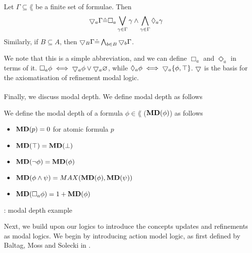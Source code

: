 \begin{defn} \label{coverDef}
Let $\Gamma \subseteq \lang$ be a finite set of formulae.
Then
\[
  \bigtriangledown_a \Gamma \hat{=} \Box_a \bigvee_{\gamma \in \Gamma} \gamma \land
  \bigwedge_{\gamma \in \Gamma} \Diamond_a \gamma
\]
Similarly, if $B \subseteq A$, then $\bigtriangledown_B \Gamma \hat{=} \bigwedge_{b \in B}
\bigtriangledown_b \Gamma$.
\end{defn}
We note that this is a simple abbreviation, and we can define $\Box_a$ and
$\Diamond_a$ in terms of it.
$\Box_a \phi \iff \bigtriangledown_a \phi \lor \bigtriangledown_a \varnothing$, while $\Diamond_a
\phi \iff \bigtriangledown_a \{\phi, \top\}$.
$\bigtriangledown$ is the basis for the axiomatisation of refinement modal logic.\\
\\
Finally, we discuss modal depth.
We define modal depth as follows
\begin{defn} \label{modalDepth}
We define the modal depth of a formula $\phi \in \lang$ (${\bf MD}(\phi)$) as follows
\begin{itemize}
	\item ${\bf MD}(p) = 0$ for atomic formula $p$
	\item ${\bf MD}(\top) = {\bf MD}(\bot)$
	\item ${\bf MD}(\neg \phi) = {\bf MD}(\phi)$
	\item ${\bf MD}(\phi \land \psi) = MAX({\bf MD}(\phi), {\bf MD}(\psi))$
	\item ${\bf MD}(\Box_a \phi) = 1 + {\bf MD}(\phi)$
\end{itemize}
\end{defn}

\FIXME: modal depth example

Next, we build upon our logics to introduce the concepts updates and refinements as modal logics.
We begin by introducing action model logic, as first defined by Baltag, Moss and Solecki in
\cite{baltag1998lpa}.

